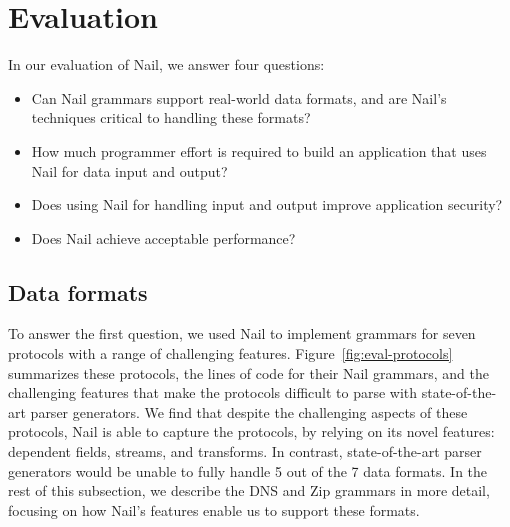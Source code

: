 \section{Evaluation}
\label{s:eval}



In our evaluation of Nail, we answer four questions:

\begin{itemize}

\item Can Nail grammars support real-world data formats, and
      are Nail's techniques critical to handling these formats?

\item How much programmer effort is required to build an
      application that uses Nail for data input and output?

\item Does using Nail for handling input and output improve
      application security?

\item Does Nail achieve acceptable performance?

\end{itemize}

\subsection{Data formats}
\label{s:eval-formats}

To answer the first question, we used Nail to implement grammars
for seven protocols with a range of challenging features.
Figure~\ref{fig:eval-protocols} summarizes these protocols, the lines
of code for their Nail grammars, and the challenging features that make
the protocols difficult to parse with state-of-the-art parser generators.
We find that despite the challenging aspects of these protocols, Nail is
able to capture the protocols, by relying on its novel features: dependent
fields, streams, and transforms.  In contrast, state-of-the-art parser
generators would be unable to fully handle 5 out of the 7 data formats.
In the rest of this subsection, we describe the DNS and Zip grammars in
more detail, focusing on how Nail's features enable us to support these
formats.

